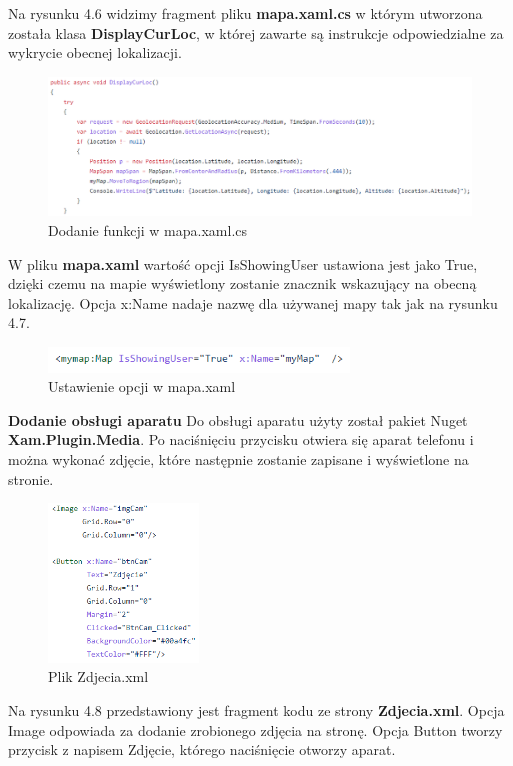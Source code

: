  Na rysunku 4.6 widzimy fragment pliku \textbf{mapa.xaml.cs} w którym utworzona została klasa \textbf{DisplayCurLoc}, w której zawarte są instrukcje odpowiedzialne za wykrycie obecnej lokalizacji.
 \newline
 \newline
 \begin{figure}[!htb]
 	\begin{center}
 		\includegraphics[width=15cm]{rys/mapa_xaml_cs.png}
 		\caption{Dodanie funkcji w mapa.xaml.cs}
 		\label{rys:rysunek017}
 	\end{center}
 \end{figure}
 
 W pliku \textbf{mapa.xaml} wartość opcji IsShowingUser ustawiona jest jako True, dzięki czemu na mapie wyświetlony zostanie znacznik wskazujący na obecną lokalizację. Opcja x:Name nadaje nazwę dla używanej mapy tak jak na rysunku 4.7.
 \newline
\begin{figure}[!htb]
	\begin{center}
		\includegraphics[width=8cm]{rys/mapa_xaml.png}
		\caption{Ustawienie opcji w mapa.xaml}
		\label{rys:rysunek018}
	\end{center}
\end{figure}
   

\textbf{Dodanie obsługi aparatu} \newline
Do obsługi aparatu użyty został pakiet Nuget \textbf{Xam.Plugin.Media}. Po naciśnięciu przycisku otwiera się aparat telefonu i można wykonać zdjęcie, które następnie zostanie zapisane i wyświetlone na stronie.
\newline
\begin{figure}[!htb]
	\begin{center}
		\includegraphics[width=4cm]{rys/Zdjecia_xaml.png}
		\caption{Plik Zdjecia.xml}
		\label{rys:rysunek019}
	\end{center}
\end{figure}
\newline
Na rysunku 4.8 przedstawiony jest fragment kodu ze strony \textbf{Zdjecia.xml}. Opcja Image odpowiada za dodanie zrobionego zdjęcia na stronę. Opcja Button tworzy przycisk z napisem Zdjęcie, którego naciśnięcie otworzy aparat.


